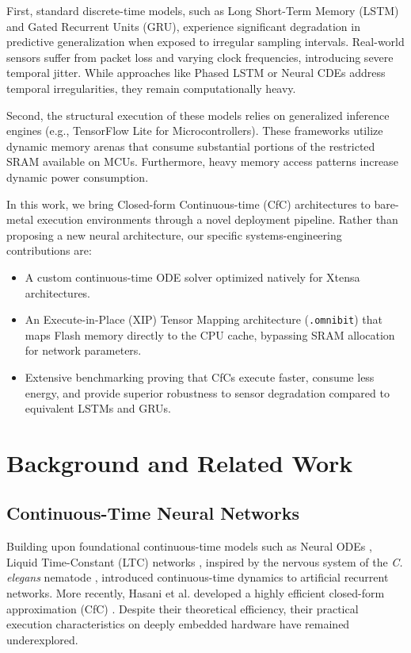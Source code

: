 \documentclass[conference]{IEEEtran}
\begin{document}
First, standard discrete-time models, such as Long Short-Term Memory (LSTM) and Gated Recurrent Units (GRU), experience significant degradation in predictive generalization when exposed to irregular sampling intervals. Real-world sensors suffer from packet loss and varying clock frequencies, introducing severe temporal jitter. While approaches like Phased LSTM \cite{neil2016phased} or Neural CDEs \cite{kidger2020neural} address temporal irregularities, they remain computationally heavy. 

Second, the structural execution of these models relies on generalized inference engines (e.g., TensorFlow Lite for Microcontrollers). These frameworks utilize dynamic memory arenas that consume substantial portions of the restricted SRAM available on MCUs. Furthermore, heavy memory access patterns increase dynamic power consumption.

In this work, we bring Closed-form Continuous-time (CfC) architectures \cite{hasani2022closed} to bare-metal execution environments through a novel deployment pipeline. Rather than proposing a new neural architecture, our specific systems-engineering contributions are:
\begin{itemize}
    \item A custom continuous-time ODE solver optimized natively for Xtensa architectures.
    \item An Execute-in-Place (XIP) Tensor Mapping architecture (\texttt{.omnibit}) that maps Flash memory directly to the CPU cache, bypassing SRAM allocation for network parameters.
    \item Extensive benchmarking proving that CfCs execute faster, consume less energy, and provide superior robustness to sensor degradation compared to equivalent LSTMs and GRUs.
\end{itemize}

\section{Background and Related Work}

\subsection{Continuous-Time Neural Networks}
Building upon foundational continuous-time models such as Neural ODEs \cite{chen2018neural, rubanova2019latent}, Liquid Time-Constant (LTC) networks \cite{hasani2020liquid}, inspired by the nervous system of the \textit{C. elegans} nematode \cite{lechner2020neural}, introduced continuous-time dynamics to artificial recurrent networks. More recently, Hasani et al. developed a highly efficient closed-form approximation (CfC) \cite{hasani2022closed}. Despite their theoretical efficiency, their practical execution characteristics on deeply embedded hardware have remained underexplored.
\end{document}
